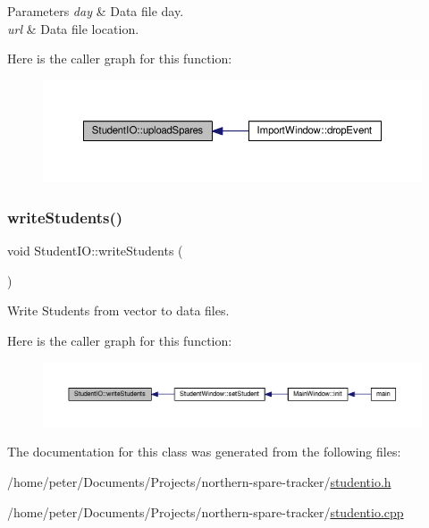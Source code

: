 \begin{DoxyParams}{Parameters}
{\em day} & Data file day. \\
\hline
{\em url} & Data file location. \\
\hline
\end{DoxyParams}
Here is the caller graph for this function\+:
\nopagebreak
\begin{figure}[H]
\begin{center}
\leavevmode
\includegraphics[width=350pt]{class_student_i_o_ad3c9ae8b97a47fb33373b51d06327bd9_icgraph}
\end{center}
\end{figure}
\mbox{\label{class_student_i_o_ac1f03a74030b8324fb12a6cd33da2df3}} 
\subsubsection{\texorpdfstring{write\+Students()}{writeStudents()}}
{\footnotesize\ttfamily void Student\+I\+O\+::write\+Students (\begin{DoxyParamCaption}{ }\end{DoxyParamCaption})}



Write Students from vector to data files. 

Here is the caller graph for this function\+:
\nopagebreak
\begin{figure}[H]
\begin{center}
\leavevmode
\includegraphics[width=350pt]{class_student_i_o_ac1f03a74030b8324fb12a6cd33da2df3_icgraph}
\end{center}
\end{figure}


The documentation for this class was generated from the following files\+:\begin{DoxyCompactItemize}
\item 
/home/peter/\+Documents/\+Projects/northern-\/spare-\/tracker/\hyperlink{studentio_8h}{studentio.\+h}\item 
/home/peter/\+Documents/\+Projects/northern-\/spare-\/tracker/\hyperlink{studentio_8cpp}{studentio.\+cpp}\end{DoxyCompactItemize}
